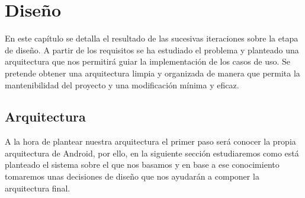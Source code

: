 \documentclass[12pt,a4paper,oneside]{book} %
\begin{document}
\chapter{Diseño}
En este capítulo se detalla el resultado de las sucesivas iteraciones sobre la etapa de diseño. A partir de los requisitos se ha estudiado el problema y planteado una arquitectura que nos permitirá guiar la implementación de los casos de uso. Se pretende obtener una arquitectura limpia y organizada de manera que permita la mantenibilidad del proyecto y una modificación mínima y eficaz. 
\section{Arquitectura}
A la hora de plantear nuestra arquitectura el primer paso será conocer la propia arquitectura de Android, por ello, en la siguiente sección estudiaremos como está planteado el sistema sobre el que nos basamos y en base a ese conocimiento tomaremos unas decisiones de diseño que nos ayudarán a componer la arquitectura final. 
\end{document}

